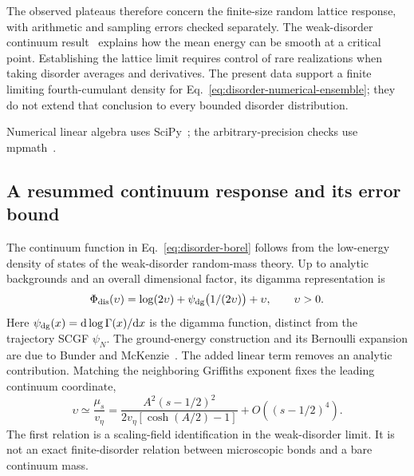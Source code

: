 \documentclass[aps,pre,reprint,amsmath,amssymb,longbibliography,floatfix]{revtex4-2}
\begin{document}
The observed plateaus therefore concern the finite-size random
lattice response, with arithmetic and sampling errors checked
separately. The weak-disorder continuum result~\cite{BunderMcKenzie1999}
explains how the mean energy can be smooth at a critical point. Establishing the lattice limit requires control of rare realizations
when taking disorder averages and derivatives. The present data support a finite limiting
fourth-cumulant density for Eq.~\eqref{eq:disorder-numerical-ensemble};
they do not extend that conclusion to every bounded disorder
distribution.

Numerical linear algebra uses SciPy~\cite{SciPy2020};
the arbitrary-precision checks use mpmath~\cite{Mpmath}.

\subsection{A resummed continuum response and its error bound}
\label{app:disorder-borel}
The continuum function in Eq.~\eqref{eq:disorder-borel} follows from
the low-energy density of states of the weak-disorder random-mass
theory. Up to analytic backgrounds and an overall dimensional factor,
its digamma representation is
\begin{equation}
 \Phi_{\rm dis}(\upsilon)
 =\log(2\upsilon)+\psi_{\rm dg}\bigl(1/(2\upsilon)\bigr)+\upsilon,
 \qquad \upsilon>0.
 \label{eq:disorder-digamma}
\end{equation}
Here $\psi_{\rm dg}(x)=\mathrm d\log\Gamma(x)/\mathrm dx$ is the
digamma function, distinct from the trajectory SCGF $\psi_N$.
The ground-energy construction and its Bernoulli expansion are due to
Bunder and McKenzie~\cite{BunderMcKenzie1999}. The added linear term
removes an analytic contribution. Matching the neighboring Griffiths
exponent fixes the leading continuum coordinate,
\begin{equation}
 \upsilon\simeq\frac{\mu_s}{v_\eta}
 =\frac{A^2(s-1/2)^2}{2v_\eta\left[\cosh(A/2)-1\right]}
 +O((s-1/2)^4).
 \label{eq:disorder-continuum-coordinate}
\end{equation}
The first relation is a scaling-field identification in the weak-disorder
limit. It is not an exact finite-disorder relation between microscopic
bonds and a bare continuum mass.
\end{document}
